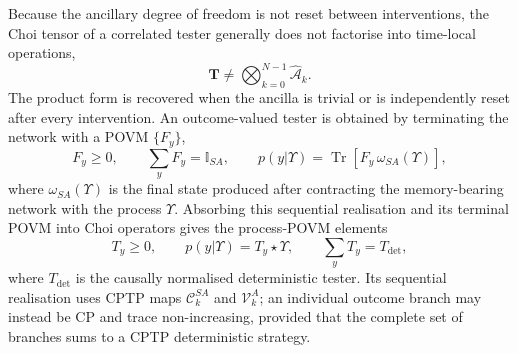 Because the ancillary degree of freedom is not reset between interventions, the Choi tensor of a correlated tester generally does not factorise into time-local operations,
%
\begin{equation}
    \mathbf T \neq \bigotimes_{k=0}^{N-1} \widehat{\mathcal A}_k .
    \label{eq:correlated-tester}
\end{equation}
%
The product form is recovered when the ancilla is trivial or is independently reset after every intervention.
An outcome-valued tester is obtained by terminating the network with a POVM \(\{F_y\}\),
%
\begin{equation}
    F_y\geq0, \qquad \sum_yF_y=\mathbb I_{SA}, \qquad p(y\vert\Upsilon)
    = \operatorname{Tr}\!\left[F_y\,\omega_{SA}(\Upsilon)\right],
    \label{eq:tester-terminal-povm}
\end{equation}
%
where \(\omega_{SA}(\Upsilon)\) is the final state produced after contracting the memory-bearing network with the process \(\Upsilon\).
Absorbing this sequential realisation and its terminal POVM into Choi operators gives the process-POVM elements \cite{Ziman2008ProcessPOVM,Chiribella2009}
%
\begin{equation}
    T_y\geq0, \qquad p(y\vert\Upsilon)=T_y\star\Upsilon, \qquad \sum_yT_y=T_{\mathrm{det}},
    \label{eq:tester-generalised-born-rule}
\end{equation}
%
where \(T_{\mathrm{det}}\) is the causally normalised deterministic tester.
Its sequential realisation uses CPTP maps \(\mathcal C_k^{SA}\) and \(\mathcal V_k^A\); an individual outcome branch may instead be CP and trace non-increasing, provided that the complete set of branches sums to a CPTP deterministic strategy.

